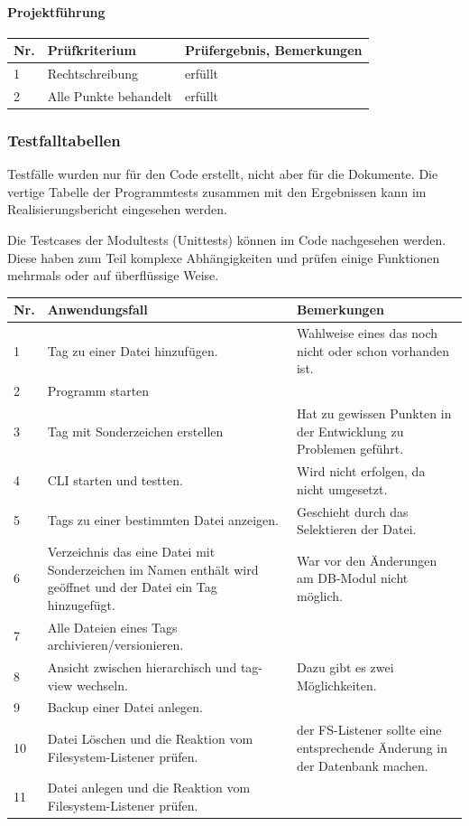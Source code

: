 \documentclass[10pt,paper=a4,final]{scrartcl}
\begin{document}
\paragraph{Projektf\"uhrung}
\begin{tabularx}{\textwidth}{|l|X|X|}
  \hline
  {{\bf Nr.}}\cellcolor{blue!20!} & {\bf Pr\"ufkriterium}\cellcolor{blue!20!} & {\bf Pr\"ufergebnis, Bemerkungen}\cellcolor{blue!20!} \\ \hline
  1 & Rechtschreibung & erf\"ullt \\ \hline
  2 & Alle Punkte behandelt & erf\"ullt\\ \hline
\end{tabularx}
\subsubsection{Testfalltabellen}
Testf\"alle wurden nur f\"ur den Code erstellt, nicht aber f\"ur die Dokumente. Die vertige Tabelle der Programmtests zusammen mit den Ergebnissen kann im Realisierungsbericht \cite{realisierung}eingesehen werden.

Die Testcases der Modultests (Unittests) k\"onnen im Code nachgesehen werden. Diese haben zum Teil komplexe Abh\"angigkeiten und pr\"ufen einige Funktionen mehrmals oder auf \"uberfl\"ussige Weise.
\begin{tabularx}{\textwidth}{|l|X|X|}
\hline
\bf Nr. \cellcolor{blue!20!}& \bf Anwendungsfall \cellcolor{blue!20!} & \bf Bemerkungen \cellcolor{blue!20!} \\ \hline
1 & Tag zu einer Datei hinzuf\"ugen. & Wahlweise eines das noch nicht oder schon vorhanden ist. \\ \hline
2 & Programm starten& \\ \hline
3 & Tag mit Sonderzeichen erstellen & Hat zu gewissen Punkten in der Entwicklung zu Problemen gef\"uhrt. \\ \hline
4 & CLI starten und testten. & Wird nicht erfolgen, da nicht umgesetzt. \\ \hline
5 & Tags zu einer bestimmten Datei anzeigen. & Geschieht durch das Selektieren der Datei. \\ \hline
6 & Verzeichnis das eine Datei mit Sonderzeichen im Namen enthält wird geöffnet und der Datei ein Tag hinzugefügt.& War vor den \"Anderungen am DB-Modul nicht m\"oglich. \\ \hline
7 & Alle Dateien eines Tags archivieren/versionieren. & \\ \hline
8 & Ansicht zwischen hierarchisch und tag-view wechseln.& Dazu gibt es zwei M\"oglichkeiten. \\ \hline
9 & Backup einer Datei anlegen.& \\ \hline
10 & Datei L\"oschen und die Reaktion vom Filesystem-Listener pr\"ufen.& der FS-Listener sollte eine entsprechende \"Anderung in der Datenbank machen.\\ \hline
11 & Datei anlegen  und die Reaktion vom Filesystem-Listener pr\"ufen.& \\ \hline
\end{tabularx}
\end{document}
